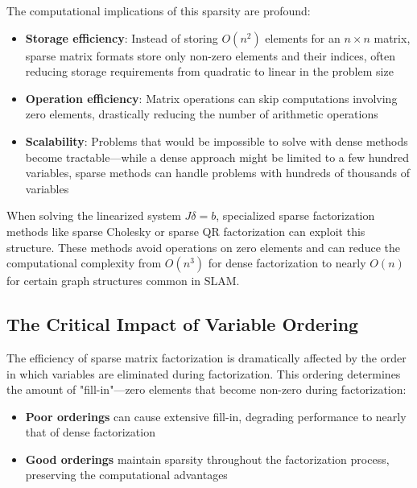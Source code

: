 \documentclass[journal]{IEEEtran}
\begin{document}
The computational implications of this sparsity are profound:

\begin{itemize}
    \item \textbf{Storage efficiency}: Instead of storing $O(n^2)$ elements for an $n \times n$ matrix, sparse matrix formats store only non-zero elements and their indices, often reducing storage requirements from quadratic to linear in the problem size
    
    \item \textbf{Operation efficiency}: Matrix operations can skip computations involving zero elements, drastically reducing the number of arithmetic operations
    
    \item \textbf{Scalability}: Problems that would be impossible to solve with dense methods become tractable—while a dense approach might be limited to a few hundred variables, sparse methods can handle problems with hundreds of thousands of variables
\end{itemize}

When solving the linearized system $J\delta = b$, specialized sparse factorization methods like sparse Cholesky or sparse QR factorization can exploit this structure. These methods avoid operations on zero elements and can reduce the computational complexity from $O(n^3)$ for dense factorization to nearly $O(n)$ for certain graph structures common in SLAM.

\subsection{The Critical Impact of Variable Ordering}

The efficiency of sparse matrix factorization is dramatically affected by the order in which variables are eliminated during factorization. This ordering determines the amount of "fill-in"—zero elements that become non-zero during factorization:

\begin{itemize}
    \item \textbf{Poor orderings} can cause extensive fill-in, degrading performance to nearly that of dense factorization
    
    \item \textbf{Good orderings} maintain sparsity throughout the factorization process, preserving the computational advantages
\end{itemize}
\end{document}
